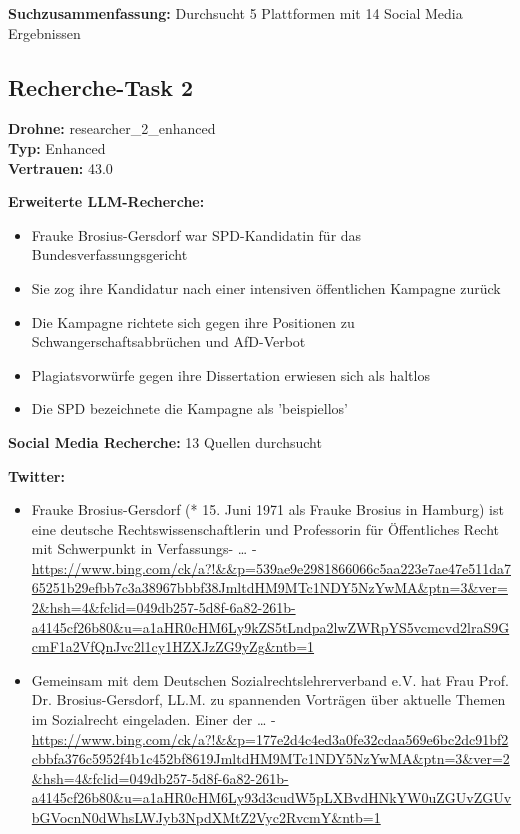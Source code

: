 \documentclass[12pt,a4paper]{article}
\begin{document}
\textbf{Suchzusammenfassung:} Durchsucht 5 Plattformen mit 14 Social Media Ergebnissen

\subsection{Recherche-Task 2}

\textbf{Drohne:} researcher\_2\_enhanced\\
\textbf{Typ:} Enhanced\\
\textbf{Vertrauen:} 43.0%

\textbf{Erweiterte LLM-Recherche:}
\begin{itemize}
\item Frauke Brosius-Gersdorf war SPD-Kandidatin für das Bundesverfassungsgericht
\item Sie zog ihre Kandidatur nach einer intensiven öffentlichen Kampagne zurück
\item Die Kampagne richtete sich gegen ihre Positionen zu Schwangerschaftsabbrüchen und AfD-Verbot
\item Plagiatsvorwürfe gegen ihre Dissertation erwiesen sich als haltlos
\item Die SPD bezeichnete die Kampagne als 'beispiellos'
\end{itemize}

\textbf{Social Media Recherche:} 13 Quellen durchsucht

\textbf{Twitter:}
\begin{itemize}
\item Frauke Brosius-Gersdorf (* 15. Juni 1971 als Frauke Brosius in Hamburg) ist eine deutsche Rechtswissenschaftlerin und Professorin für Öffentliches Recht mit Schwerpunkt in Verfassungs- … - \url{https://www.bing.com/ck/a?!&&p=539ae9e2981866066c5aa223e7ae47e511da765251b29efbb7c3a38967bbbf38JmltdHM9MTc1NDY5NzYwMA&ptn=3&ver=2&hsh=4&fclid=049db257-5d8f-6a82-261b-a4145cf26b80&u=a1aHR0cHM6Ly9kZS5tLndpa2lwZWRpYS5vcmcvd2lraS9GcmF1a2VfQnJvc2l1cy1HZXJzZG9yZg&ntb=1}
\item Gemeinsam mit dem Deutschen Sozialrechtslehrerverband e.V. hat Frau Prof. Dr. Brosius-Gersdorf, LL.M. zu spannenden Vorträgen über aktuelle Themen im Sozialrecht eingeladen. Einer der … - \url{https://www.bing.com/ck/a?!&&p=177e2d4c4ed3a0fe32cdaa569e6bc2dc91bf2cbbfa376c5952f4b1c452bf8619JmltdHM9MTc1NDY5NzYwMA&ptn=3&ver=2&hsh=4&fclid=049db257-5d8f-6a82-261b-a4145cf26b80&u=a1aHR0cHM6Ly93d3cudW5pLXBvdHNkYW0uZGUvZGUvbGVocnN0dWhsLWJyb3NpdXMtZ2Vyc2RvcmY&ntb=1}
\end{itemize}
\end{document}
